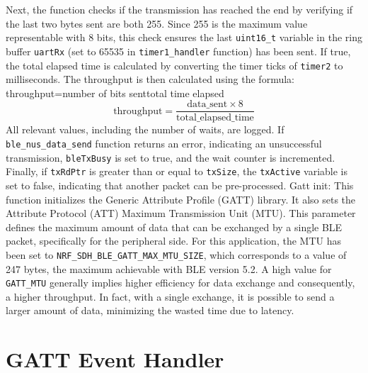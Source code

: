 \documentclass{Configuration_Files/PoliMi3i_thesis}
\begin{document}
Next, the function checks if the transmission has reached the end by verifying if the last two bytes sent are both 255. Since 255 is the maximum value representable with 8 bits, this check ensures the last \texttt{uint16\_t} variable in the ring buffer \texttt{uartRx} (set to 65535 in \texttt{timer1\_handler} function) has been sent. If true, the total elapsed time is calculated by converting the timer ticks of \texttt{timer2} to milliseconds. The throughput is then calculated using the formula: throughput=number of bits senttotal time elapsed
\[
\text{throughput} = \frac{\text{data\_sent} \times 8}{\text{total\_elapsed\_time}}
\]
All relevant values, including the number of waits, are logged. If \texttt{ble\_nus\_data\_send} function returns an error, indicating an unsuccessful transmission, \texttt{bleTxBusy} is set to true, and the wait counter is incremented. Finally, if \texttt{txRdPtr} is greater than or equal to \texttt{txSize}, the \texttt{txActive} variable is set to false, indicating that another packet can be pre-processed.
Gatt init: This function initializes the Generic Attribute Profile (GATT) library. It also sets the Attribute Protocol (ATT) Maximum Transmission Unit (MTU). This parameter defines the maximum amount of data that can be exchanged by a single BLE packet, specifically for the peripheral side. For this application, the MTU has been set to \texttt{NRF\_SDH\_BLE\_GATT\_MAX\_MTU\_SIZE}, which corresponds to a value of 247 bytes, the maximum achievable with BLE version 5.2. A high value for \texttt{GATT\_MTU} generally implies higher efficiency for data exchange and consequently, a higher throughput. In fact, with a single exchange, it is possible to send a larger amount of data, minimizing the wasted time due to latency.

\section*{GATT Event Handler}
\end{document}
